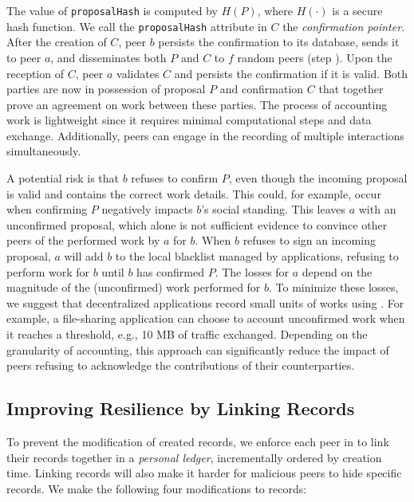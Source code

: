 The value of \texttt{proposalHash} is computed by $ H(P) $, where $ H(\cdot) $ is a secure hash function.
We call the \texttt{proposalHash} attribute in $ C $ the \emph{confirmation pointer}.
After the creation of $ C $, peer $ b $ persists the confirmation to its database, sends it to peer $ a $, and disseminates both $ P $ and $ C $ to $ f $ random peers (step ).
Upon the reception of $ C $, peer $ a $ validates $ C $ and persists the confirmation if it is valid.
Both parties are now in possession of proposal $ P $ and confirmation $ C $ that together prove an agreement on work between these parties.
The process of accounting work is lightweight since it requires minimal computational steps and data exchange. 
Additionally, peers can engage in the recording of multiple interactions simultaneously.

A potential risk is that $ b $ refuses to confirm $ P $, even though the incoming proposal is valid and contains the correct work details.
This could, for example, occur when confirming $ P $ negatively impacts $ b $'s social standing.
This leaves $ a $ with an unconfirmed proposal, which alone is not sufficient evidence to convince other peers of the performed work by $ a $ for $ b $.
When $ b $ refuses to sign an incoming proposal, $ a $ will add $ b $ to the local blacklist managed by applications, refusing to perform work for $ b $ until $ b $ has confirmed $ P $.
The losses for $ a $ depend on the magnitude of the (unconfirmed) work performed for $ b $.
To minimize these losses, we suggest that decentralized applications record small units of works using \TrustChain{}.
For example, a file-sharing application can choose to account unconfirmed work when it reaches a threshold, e.g., 10 MB of traffic exchanged.
Depending on the granularity of accounting, this approach can significantly reduce the impact of peers refusing to acknowledge the contributions of their counterparties.

\subsection{Improving Resilience by Linking Records}
To prevent the modification of created records, we enforce each peer in \TrustChain{} to link their records together in a \emph{personal ledger}, incrementally ordered by creation time.
Linking records will also make it harder for malicious peers to hide specific records.
We make the following four modifications to records:

